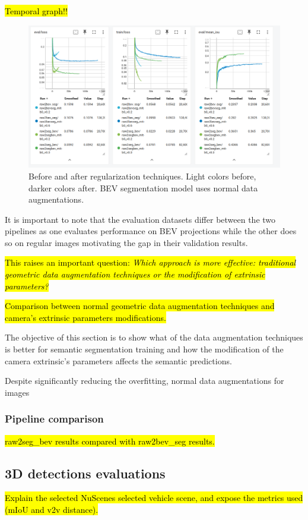 \hl{Temporal graph!!}
\begin{figure}[h!]
    \centering
    \includegraphics[width=0.7\linewidth]{./images/experiments/before_an_after_data_aug.png}
    \caption{Before and after regularization techniques. Light colors before, darker colors after. BEV segmentation model uses normal data augmentations.}
    \label{fig:before_after_data_aug}
\end{figure}

It is important to note that the evaluation datasets differ between the two pipelines as one evaluates performance on BEV projections while the other does so on regular images motivating the gap in their validation results.

\hl{This raises an important question: \textit{Which approach is more effective: traditional geometric data augmentation techniques or the modification of extrinsic parameters?}}

\hl{Comparison between normal geometric data augmentation techniques and camera's extrinsic parameters modifications.}

The objective of this section is to show what of the data augmentation techniques is better for  semantic segmentation training and how the modification of the camera extrinsic's parameters affects the semantic predictions.

Despite significantly reducing the overfitting, normal data augmentations for  images


\subsubsection{Pipeline comparison}
\hl{raw2seg\_bev results compared with raw2bev\_seg results.}



\subsection{3D detections evaluations}
\hl{Explain the selected NuScenes selected vehicle scene, and expose the metrics used (mIoU and v2v distance).}


